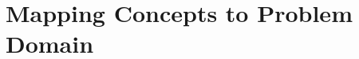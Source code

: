 \documentclass[multi,crop=false,class=article]{standalone}
\begin{document}
\section{Mapping Concepts to Problem Domain}
\label{sec:mapp-conc-probl}
\end{document}
